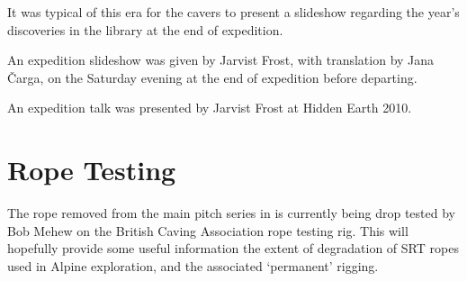     \begin{marginfigure}
\checkoddpage \ifoddpage \forcerectofloat \else \forceversofloat \fi
\centering
 \caption{It was typical of this era for the  cavers to present a slideshow regarding the year's discoveries in the \protect{} library at the end of expedition. }
 \label{Tolmin slideshow 2009}
\end{marginfigure}

An expedition slideshow was given by Jarvist Frost, with translation by Jana Čarga, on the Saturday evening at the end of expedition before departing.

An expedition talk was presented by Jarvist Frost at Hidden Earth 2010.




\section{Rope Testing}

The rope removed from the main pitch series in  is currently being
drop tested by Bob Mehew on the British Caving Association rope testing rig. This will hopefully provide some useful information the extent of degradation of SRT ropes used in
Alpine exploration, and the associated `permanent' rigging.
